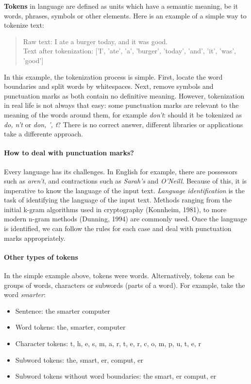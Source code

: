 \textbf{Tokens} in language are defined as units which have a semantic meaning, be it words, phrases, symbols or other elements. Here is an example of a simple way to tokenize text:

\begin{quote}
    Raw text: I ate a burger today, and it was good.\\
    Text after tokenization: ['I', 'ate', 'a', 'burger', 'today', 'and', 'it', 'was', 'good']
\end{quote}

In this example, the tokenization process is simple. First, locate the word boundaries and split words by whitespaces. Next, remove symbols and punctuation marks as both contain no definitive meaning. However, tokenization in real life is not always that easy: some punctuation marks are relevant to the meaning of the words around them, for example \emph{don't}: should it be tokenized as \emph{do, n't} or \emph{don, ', t}? There is no correct answer, different libraries or applications take a differente approach.

\paragraph{How to deal with punctuation marks?}

Every language has its challenges. In English for example, there are possessors such as \emph{aren't}, and contractions such as \emph{Sarah's} and \emph{O'Neill}. Because of this, it is imperative to know the language of the input text. \textit{Language identification} is the task of identifying the language of the input text. Methods ranging from the initial k-gram algorithms used in cryptography (Konnheim, 1981), to more modern n-gram methods (Dunning, 1994) are commonly used. Once the language is identified, we can follow the rules for each case and deal with punctuation marks appropriately.

\paragraph{Other types of tokens}

In the simple example above, tokens were words. Alternatively, tokens can be groups of words, characters or subwords (parts of a word). For example, take the word \emph{smarter}:

\begin{itemize}
    \item Sentence: the smarter computer
    \item Word tokens: the, smarter, computer
    \item Character tokens: t, h, e, s, m, a, r, t, e, r, c, o, m, p, u, t, e, r
    \item Subword tokens: the, smart, er, comput, er
    \item Subword tokens without word boundaries: the smart, er comput, er
\end{itemize}

